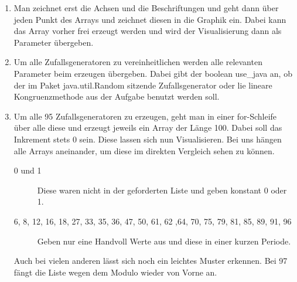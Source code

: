 \documentclass[a4paper,11pt]{article}             %
\begin{document}

\begin{enumerate}

\item Man zeichnet erst die Achsen und die Beschriftungen und geht dann über jeden Punkt des Arrays und zeichnet diesen in die Graphik ein. Dabei kann das Array vorher frei erzeugt werden und wird der Visualisierung dann als Parameter übergeben.

\item Um alle Zufallsgeneratoren zu vereinheitlichen werden alle relevanten Parameter beim erzeugen übergeben. Dabei gibt der boolean use\_java an, ob der im Paket java.util.Random sitzende Zufallsgenerator oder lie lineare Kongruenzmethode aus der Aufgabe benutzt werden soll.

\item Um alle 95 Zufallsgeneratoren zu erzeugen, geht man in einer for-Schleife über alle diese und erzeugt jeweils ein Array der Länge 100. Dabei soll das Inkrement stets 0 sein. Diese lassen sich nun Visualisieren. Bei uns hängen alle Arrays aneinander, um diese im direkten Vergleich sehen zu können.

\begin{description}
\item [0 und 1] Diese waren nicht in der geforderten Liste und geben konstant 0 oder 1.
\item [6, 8, 12, 16, 18, 27, 33, 35, 36, 47, 50, 61, 62 ,64, 70, 75, 79, 81, 85, 89, 91, 96] Geben nur eine Handvoll Werte aus und diese in einer kurzen Periode.
\end{description}

Auch bei vielen anderen lässt sich noch ein leichtes Muster erkennen.
Bei 97 fängt die Liste wegen dem Modulo wieder von Vorne an.

\end{enumerate}
\end{document}

